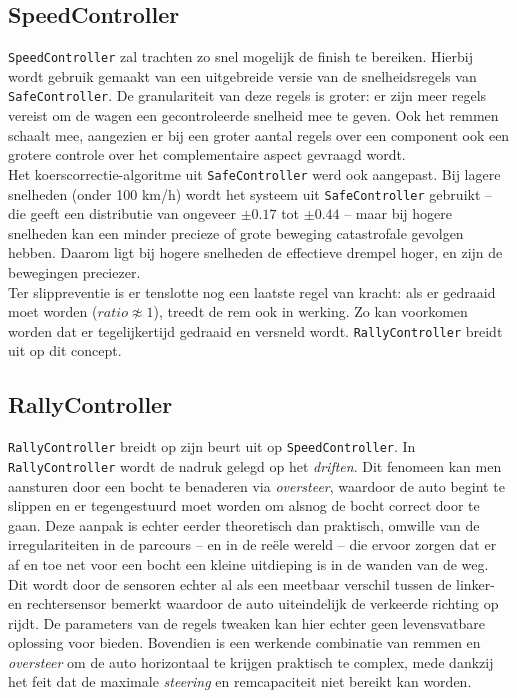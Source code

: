 \documentclass[10pt,a4paper]{article}
\begin{document}
		\subsection{SpeedController}
			\texttt{SpeedController} zal trachten zo snel mogelijk de finish te bereiken. Hierbij wordt gebruik gemaakt van een uitgebreide versie van de snelheidsregels van \texttt{SafeController}. De granulariteit van deze regels is groter: er zijn meer regels vereist om de wagen een gecontroleerde snelheid mee te geven. Ook het remmen schaalt mee, aangezien er bij een groter aantal regels over een component ook een grotere controle over het complementaire aspect gevraagd wordt.\\

			Het koerscorrectie-algoritme uit \texttt{SafeController} werd ook aangepast. Bij lagere snelheden (onder 100 km/h) wordt het systeem uit \texttt{SafeController} gebruikt -- die geeft een distributie van ongeveer $\pm 0.17$ tot $\pm 0.44$ -- maar bij hogere snelheden kan een minder precieze of grote beweging catastrofale gevolgen hebben. Daarom ligt bij hogere snelheden de effectieve drempel hoger, en zijn de bewegingen preciezer.\\

			Ter slippreventie is er tenslotte nog een laatste regel van kracht: als er gedraaid moet worden ($ratio \not\approx 1$), treedt de rem ook in werking. Zo kan voorkomen worden dat er tegelijkertijd gedraaid en versneld wordt. \texttt{RallyController} breidt uit op dit concept.

		\subsection{RallyController}
			\texttt{RallyController} breidt op zijn beurt uit op \texttt{SpeedController}. In \texttt{RallyController} wordt de nadruk gelegd op het \textit{driften}. Dit fenomeen kan men aansturen door een bocht te benaderen via \textit{oversteer}, waardoor de auto begint te slippen en er tegengestuurd moet worden om alsnog de bocht correct door te gaan. Deze aanpak is echter eerder theoretisch dan praktisch, omwille van de irregulariteiten in de parcours -- en in de re\"ele wereld -- die ervoor zorgen dat er af en toe net voor een bocht een kleine uitdieping is in de wanden van de weg. Dit wordt door de sensoren echter al als een meetbaar verschil tussen de linker- en rechtersensor bemerkt waardoor de auto uiteindelijk de verkeerde richting op rijdt. De parameters van de regels tweaken kan hier echter geen levensvatbare oplossing voor bieden. Bovendien is een werkende combinatie van remmen en \textit{oversteer} om de auto horizontaal te krijgen praktisch te complex, mede dankzij het feit dat de maximale \textit{steering} en remcapaciteit niet bereikt kan worden.\\
\end{document}
